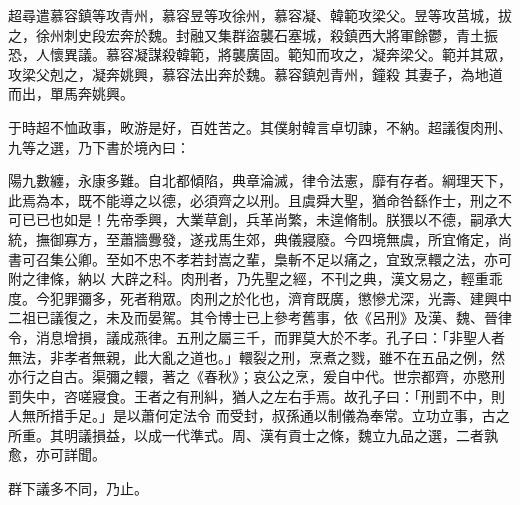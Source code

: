 \begin{pinyinscope}
 超尋遣慕容鎮等攻青州，慕容昱等攻徐州，慕容凝、韓範攻梁父。昱等攻莒城，拔之，徐州刺史段宏奔於魏。封融又集群盜襲石塞城，殺鎮西大將軍餘鬱，青土振恐，人懷異議。慕容凝謀殺韓範，將襲廣固。範知而攻之，凝奔梁父。範并其眾，攻梁父剋之，凝奔姚興，慕容法出奔於魏。慕容鎮剋青州，鐘殺
 其妻子，為地道而出，單馬奔姚興。



 于時超不恤政事，畋游是好，百姓苦之。其僕射韓言卓切諫，不納。超議復肉刑、九等之選，乃下書於境內曰：



 陽九數纏，永康多難。自北都傾陷，典章淪滅，律令法憲，靡有存者。綱理天下，此焉為本，既不能導之以德，必須齊之以刑。且虞舜大聖，猶命咎繇作士，刑之不可已已也如是！先帝季興，大業草創，兵革尚繁，未遑脩制。朕猥以不德，嗣承大統，撫御寡方，至蕭牆釁發，遂戎馬生郊，典儀寢廢。今四境無虞，所宜脩定，尚書可召集公卿。至如不忠不孝若封嵩之輩，梟斬不足以痛之，宜致烹轘之法，亦可附之律條，納以
 大辟之科。肉刑者，乃先聖之經，不刊之典，漢文易之，輕重乖度。今犯罪彌多，死者稍眾。肉刑之於化也，濟育既廣，懲慘尤深，光壽、建興中二祖已議復之，未及而晏駕。其令博士已上參考舊事，依《呂刑》及漢、魏、晉律令，消息增損，議成燕律。五刑之屬三千，而罪莫大於不孝。孔子曰：「非聖人者無法，非孝者無親，此大亂之道也。」轘裂之刑，烹煮之戮，雖不在五品之例，然亦行之自古。渠彌之轘，著之《春秋》；哀公之烹，爰自中代。世宗都齊，亦愍刑罰失中，咨嗟寢食。王者之有刑糾，猶人之左右手焉。故孔子曰：「刑罰不中，則人無所措手足。」是以蕭何定法令
 而受封，叔孫通以制儀為奉常。立功立事，古之所重。其明議損益，以成一代準式。周、漢有貢士之條，魏立九品之選，二者孰愈，亦可詳聞。



 群下議多不同，乃止。




\end{pinyinscope}
